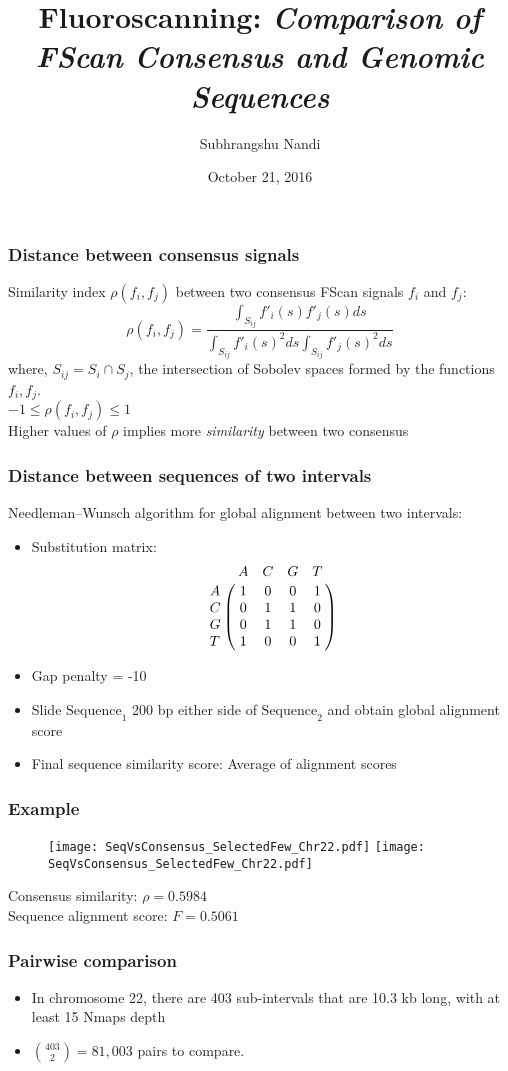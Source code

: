 \documentclass[10pt,dvipsnames,table]{beamer}
\title[Fluoroscanning]{Fluoroscanning: {\emph{Comparison of FScan Consensus and Genomic Sequences}}}
\author{Subhrangshu Nandi}
\date{October 21, 2016}
\begin{document}
\setlength{\baselineskip}{16truept}
\frame{\maketitle}

\begin{frame}
\frametitle{Distance between consensus signals}
Similarity index $\rho(f_i, f_j)$ between two consensus FScan signals $f_i$ and $f_j$:
\[ \rho(f_i, f_j) = \frac{\int _{S_{ij}}f'_i(s)f'_j(s) ds}{\int _{S_{ij}}f'_i(s)^2 ds \int _{S_{ij}}f'_j(s)^2 ds} \]
where, $S_{ij} = S_i \cap S_j$, the intersection of Sobolev spaces formed by the functions $f_i, f_j$.\\
$-1 \leq \rho(f_i, f_j) \leq 1$ \\
Higher values of $\rho$ implies more {\emph{similarity}} between two consensus

\end{frame}

\begin{frame}
\frametitle{Distance between sequences of two intervals}
Needleman–Wunsch algorithm for global alignment between two intervals:
\begin{itemize}
\item Substitution matrix: \\
\[ \bordermatrix{~  & A & C & G & T \cr
                  A & 1 & 0 & 0 & 1 \cr
                  C & 0 & 1 & 1 & 0 \cr
                  G & 0 & 1 & 1 & 0 \cr
                  T & 1 & 0 & 0 & 1 \cr
}
\]
\item Gap penalty = -10
\item Slide $\text{Sequence}_1$ 200 bp either side of $\text{Sequence}_2$ and obtain global alignment score
\item Final sequence similarity score: Average of alignment scores
\end{itemize}

\end{frame}

\begin{frame}
\frametitle{Example}
\begin{figure}
\begin{centering}
\texttt{[image: SeqVsConsensus\_SelectedFew\_Chr22.pdf]}
\texttt{[image: SeqVsConsensus\_SelectedFew\_Chr22.pdf]}
\end{centering}
\end{figure}
Consensus similarity: $\rho = 0.5984$ \\
Sequence alignment score: $F = 0.5061$

\end{frame}

\begin{frame}
\frametitle{Pairwise comparison}
\begin{itemize}
\item In chromosome 22, there are 403 sub-intervals that are 10.3 kb long, with at least 15 Nmaps depth
\item $ \binom {403} {2} = 81,003 $ pairs to compare. 
\end{itemize}

\end{frame}
\end{document}
